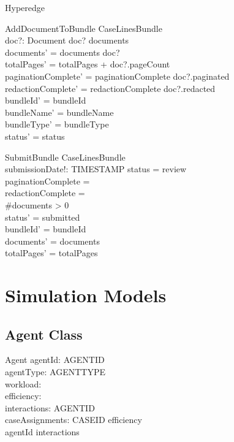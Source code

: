 \documentclass{article}
\begin{document}
\begin{class}{Hyperedge}
\begin{schema}{AddDocumentToBundle}
    \Delta CaseLinesBundle \\
    doc?: Document
\where
    doc? \notin \ran documents \\
    documents' = documents \cat \langle doc? \rangle \\
    totalPages' = totalPages + doc?.pageCount \\
    paginationComplete' = paginationComplete \land doc?.paginated \\
    redactionComplete' = redactionComplete \land doc?.redacted \\
    bundleId' = bundleId \\
    bundleName' = bundleName \\
    bundleType' = bundleType \\
    status' = status
\end{schema}

\begin{schema}{SubmitBundle}
    \Delta CaseLinesBundle \\
    submissionDate!: TIMESTAMP
\where
    status = review \\
    paginationComplete = \true \\
    redactionComplete = \true \\
    \#documents > 0 \\
    status' = submitted \\
    bundleId' = bundleId \\
    documents' = documents \\
    totalPages' = totalPages
\end{schema}

\newpage

\section{Simulation Models}

\subsection{Agent Class}

\begin{class}{Agent}
    agentId: AGENTID \\
    agentType: AGENTTYPE \\
    workload: \nat \\
    efficiency: \real \\
    interactions: \power AGENTID \\
    caseAssignments: \power CASEID
 \leq efficiency  \\
    agentId \notin interactions
\end{class}


\end{class}
\end{document}
